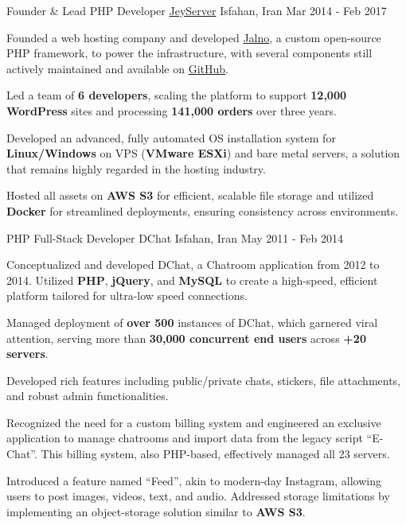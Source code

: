 \begin{cventries}
  \cventry
    {Founder \& Lead PHP Developer} %
    {\href{https://jeyserver.com}{JeyServer}} %
    {Isfahan, Iran} %
    {Mar 2014 - Feb 2017} %
    {
      \begin{cvitems}
        \item {Founded a web hosting company and developed \href{https://jalno.ir/en/}{Jalno}, a custom open-source PHP framework, to power the infrastructure, with several components still actively maintained and available on \href{https://github.com/jeyserver}{GitHub}.}
        \item {Led a team of \textbf{6 developers}, scaling the platform to support \textbf{12,000 WordPress} sites and processing \textbf{141,000 orders} over three years.}
        \item {Developed an advanced, fully automated OS installation system for \textbf{Linux/Windows} on VPS (\textbf{VMware ESXi}) and bare metal servers, a solution that remains highly regarded in the hosting industry.}
        \item {Hosted all assets on \textbf{AWS S3} for efficient, scalable file storage and utilized \textbf{Docker} for streamlined deployments, ensuring consistency across environments.}
      \end{cvitems}
    }
  
  \cventry
    {PHP Full-Stack Developer} %
    {DChat} %
    {Isfahan, Iran} %
    {May 2011 - Feb 2014} %
    {
      \begin{cvitems} %
        \item {Conceptualized and developed DChat, a Chatroom application from 2012 to 2014. Utilized \textbf{PHP}, \textbf{jQuery}, and \textbf{MySQL} to create a high-speed, efficient platform tailored for ultra-low speed connections.}
        \item {Managed deployment of \textbf{over 500} instances of DChat, which garnered viral attention, serving more than \textbf{30,000 concurrent end users} across \textbf{+20 servers}.}
        \item {Developed rich features including public/private chats, stickers, file attachments, and robust admin functionalities.}
        \item {Recognized the need for a custom billing system and engineered an exclusive application to manage chatrooms and import data from the legacy script “E-Chat”. This billing system, also PHP-based, effectively managed all 23 servers.}
        \item {Introduced a feature named “Feed”, akin to modern-day Instagram, allowing users to post images, videos, text, and audio. Addressed storage limitations by implementing an object-storage solution similar to \textbf{AWS S3}.}
      \end{cvitems}
    }

\end{cventries}
